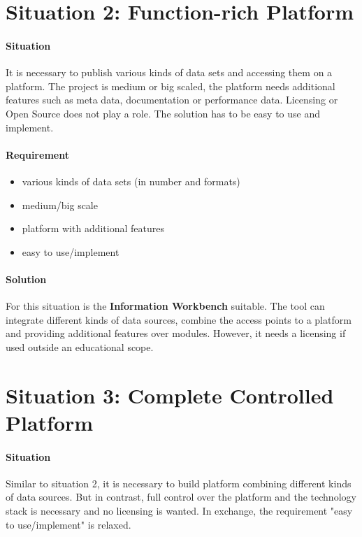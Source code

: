 \section{Situation 2: Function-rich Platform}
\paragraph{Situation}
It is necessary to publish various kinds of data sets and accessing them on a platform. The project is medium or big scaled, the platform needs additional features such as meta data, documentation or performance data. Licensing or Open Source does not play a role. The solution has to be easy to use and implement.

\paragraph{Requirement}
\begin{itemize}
\item various kinds of data sets (in number and formats)
\item medium/big scale
\item platform with additional features
\item easy to use/implement
\end{itemize}

\paragraph{Solution}
For this situation is the \textbf{Information Workbench} suitable. The tool can integrate different kinds of data sources, combine the access points to a platform and providing additional features over modules. However, it needs a licensing if used outside an educational scope.

\section{Situation 3: Complete Controlled Platform}
\paragraph{Situation}
Similar to situation 2, it is necessary to build platform combining different kinds of data sources. But in contrast, full control over the platform and the technology stack is necessary and no licensing is wanted. In exchange, the requirement "easy to use/implement" is relaxed.


